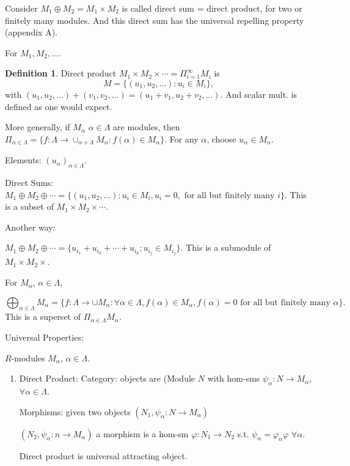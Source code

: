 \documentclass[12pt]{amsbook}
\theoremstyle{plain}
\numberwithin{section}{chapter}
\numberwithin{equation}{chapter}
\theoremstyle{definition}
\newtheorem{Def}[theorem]{Definition}
\theoremstyle{remark}
\renewcommand{\phi}{\varphi}
\begin{document}
Consider $M_1 \oplus M_2 = M_1 \times M_2$ is called direct sum = direct product, for two or finitely many modules. And this direct sum has the universal repelling property (appendix A). 

For $M_1,M_2,...$. 

\begin{Def}
Direct product $M_1 \times M_2 \times \cdots = \Pi_{i = 1}^\infty M_i$ is 
$$
M = \{(u_1,u_2,...): u_i \in M_i\},
$$
with $(u_1,u_2,...) + (v_1,v_2,...) = (u_1 + v_1,u_2 + v_2,...)$. And scalar mult. is defined as one would expect. 


\end{Def}

More generally, if $M_\alpha$ $\alpha \in \Lambda$ are modules, then $\Pi_{\alpha \in \Lambda} = \{f: \Lambda \to \cup_{\alpha + \Lambda}M_\alpha: f(\alpha) \in M_\alpha\}$. For any $\alpha$, choose $u_\alpha \in M_\alpha$. 

Elements: $(u_\alpha)_{\alpha \in \Lambda}$. 

Direct Sums: $M_1 \oplus M_2 \oplus \cdots = \{(u_1,u_2,...): u_i \in M_i,u_i = 0, \text{ for all but finitely many } i\}$. This is a subset of $M_1 \times M_2 \times \cdots$. 

Another way: 

$M_1 \oplus M_2 \oplus \cdots = \{u_{i_1} + u_{i_2} + \cdots + u_{i_k}:u_{i_j} \in M_{i_j}\}$. This is a submodule of $M_1 \times M_2 \times$. 

For $M_\alpha$, $\alpha \in \Lambda$, 

$$
\bigoplus_{\alpha \in \Lambda} M_\alpha = \{f: \Lambda \to \cup M_\alpha: \forall \alpha \in \Lambda, f(\alpha) \in M_\alpha, f(\alpha) = 0 \text{ for all but finitely many } \alpha\}.
$$ 
This is a superset of $\Pi_{\alpha \in \Lambda}M_\alpha$. 

Universal Properties: 

$R$-modules $M_\alpha$, $\alpha \in \Lambda$. 

\begin{enumerate}
\item Direct Product: 
Category: objects are (Module $N$ with hom-sms $\psi_\alpha: N \to M_\alpha$, $\forall \alpha \in \Lambda$. 

Morphisms: given two objects 
$(N_1,\psi_\alpha:N \to M_\alpha)$

$(N_2,\psi_\alpha:n \to M_\alpha)$
a morphism is a hom-sm $\phi: N_1 \to N_2$ 
s.t. $\psi_\alpha = \phi_\alpha \phi$ $\forall \alpha$. 

Direct product is universal attracting object. 
\end{enumerate}
\end{document}
